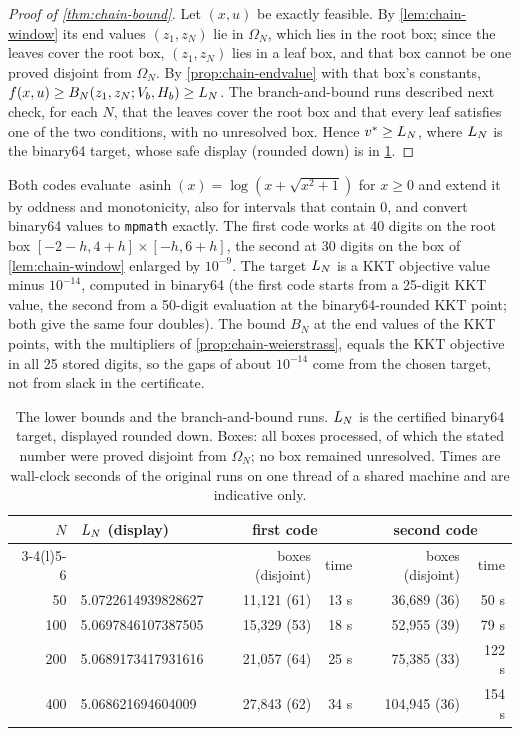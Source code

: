 \begin{proof}[Proof of \cref{thm:chain-bound}]
Let $(x,u)$ be exactly feasible.
By \cref{lem:chain-window} its end values $(z_1, z_N)$ lie in $\Omega_N$, which lies in the root box; since the leaves cover the root box, $(z_1, z_N)$ lies in a leaf box, and that box cannot be one proved disjoint from $\Omega_N$.
By \cref{prop:chain-endvalue} with that box's constants, $f(x,u) \ge B_N(z_1, z_N; V_b, H_b) \ge L_N$.
The branch-and-bound runs described next check, for each $N$, that the leaves cover the root box and that every leaf satisfies one of the two conditions, with no unresolved box.
Hence $v^{*} \ge L_N$, where $L_N$ is the binary64 target, whose safe display (rounded down) is in \cref{tab:chain-bnb}.
\end{proof}

Both codes evaluate $\operatorname{asinh}(x) = \log(x + \sqrt{x^2+1})$ for $x \ge 0$ and extend it by oddness and monotonicity, also for intervals that contain $0$, and convert binary64 values to \texttt{mpmath} exactly.
The first code works at 40 digits on the root box $[-2-h, 4+h]\times[-h, 6+h]$, the second at 30 digits on the box of \cref{lem:chain-window} enlarged by $10^{-9}$.
The target $L_N$ is a KKT objective value minus $10^{-14}$, computed in binary64 (the first code starts from a 25-digit KKT value, the second from a 50-digit evaluation at the binary64-rounded KKT point; both give the same four doubles).
The bound $B_N$ at the end values of the KKT points, with the multipliers of \cref{prop:chain-weierstrass}, equals the KKT objective in all 25 stored digits, so the gaps of about $10^{-14}$ come from the chosen target, not from slack in the certificate.

\begin{table}[ht]
\centering
\small
\caption{The  lower bounds and the branch-and-bound runs. $L_N$ is the certified binary64 target, displayed rounded down. Boxes: all boxes processed, of which the stated number were proved disjoint from $\Omega_N$; no box remained unresolved. Times are wall-clock seconds of the original runs on one thread of a shared machine and are indicative only.}
\label{tab:chain-bnb}
\begin{tabular}{@{}rlrrrr@{}}
\toprule
$N$ & $L_N$ (display) & \multicolumn{2}{c}{first code} & \multicolumn{2}{c}{second code} \\
\cmidrule(lr){3-4}\cmidrule(l){5-6}
 & & boxes (disjoint) & time & boxes (disjoint) & time \\
\midrule
50 & 5.0722614939828627 & 11,121 (61) & 13 s & 36,689 (36) & 50 s \\
100 & 5.0697846107387505 & 15,329 (53) & 18 s & 52,955 (39) & 79 s \\
200 & 5.0689173417931616 & 21,057 (64) & 25 s & 75,385 (33) & 122 s \\
400 & 5.068621694604009 & 27,843 (62) & 34 s & 104,945 (36) & 154 s \\
\bottomrule
\end{tabular}
\end{table}

